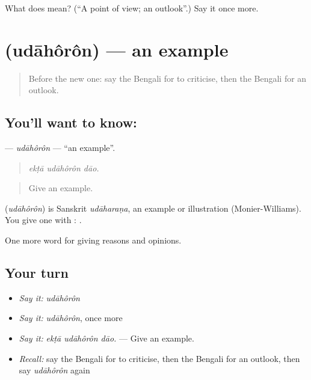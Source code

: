 \begin{tcolorbox}[breakable,colback=teal!4,colframe=teal!35!black,title={Before you move on}]
What does  mean? (\textquotedblleft{}A point of view; an outlook\textquotedblright{}.) Say it once more.
\end{tcolorbox}
\section[\texorpdfstring{\bn{উদাহরণ} (udāhôrôn)}{উদাহরণ (udāhôrôn)}]{ (udāhôrôn) — an example}

\label{lesson:BN-C335-udahoron}



\begin{quote}
Before the new one: say the Bengali for to criticise, then the Bengali for an outlook.
\end{quote}

\subsection*{You'll want to know: }
\textbf{} — \emph{udāhôrôn} — \textquotedblleft{}an example\textquotedblright{}.

\begin{quote}
  
\end{quote}

\begin{quote}
\emph{ekṭā udāhôrôn dāo.}
\end{quote}

\begin{quote}
Give an example.
\end{quote}

\begin{cousinweb}
\textbf{} (\emph{udāhôrôn}) is Sanskrit \emph{udāharaṇa}, an example or illustration (Monier-Williams). You give one with :  .
\end{cousinweb}

\begin{grammarlens}[title={What you've built}]
One more word for giving reasons and opinions.
\end{grammarlens}

\subsection*{Your turn}
\begin{itemize}
\raggedright
  \item \emph{Say it:} \emph{udāhôrôn}
  \item \emph{Say it:} \emph{udāhôrôn}, once more
  \item \emph{Say it:} \emph{ekṭā udāhôrôn dāo.} — Give an example.
  \item \emph{Recall:} say the Bengali for to criticise, then the Bengali for an outlook, then say \emph{udāhôrôn} again
\end{itemize}

